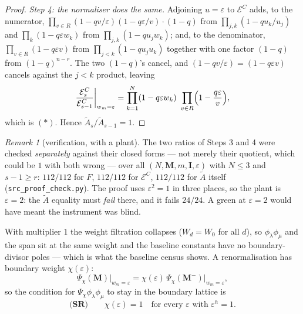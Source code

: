 \documentclass[11pt]{article}
\theoremstyle{plain}
\theoremstyle{definition}
\theoremstyle{remark}
\newtheorem{rem}[thm]{Remark}
\theoremstyle{plain}
\newcommand{\bI}{\mathbf{I}}
\newcommand{\bM}{\mathbf{M}}
\newcommand{\At}{\widetilde{A}}
\begin{document}
\begin{proof}
\emph{Step 4: the normaliser does the same.}  Adjoining $u=\varepsilon$ to
$\mathcal{E}^C$ adds, to the numerator,
$\prod_{v\in R}(1-qv/\varepsilon)(1-q\varepsilon/v)\cdot(1-q)$ from
$\prod_{j,k}(1-qu_k/u_j)$ and $\prod_k(1-q\varepsilon w_k)$ from
$\prod_{j,k}(1-qu_jw_k)$; and, to the denominator,
$\prod_{v\in R}(1-q\varepsilon v)$ from $\prod_{j<k}(1-qu_ju_k)$ together with one
factor $(1-q)$ from $(1-q)^{n-r}$.  The two $(1-q)$'s cancel, and
$(1-qv/\varepsilon)=(1-q\varepsilon v)$ cancels against the $j<k$ product, leaving
\[
  \frac{\mathcal{E}^C_{s}}{\mathcal{E}^C_{s-1}}\bigg|_{w_m=\varepsilon}
  =\prod_{k=1}^{N}(1-q\varepsilon w_k)\ \prod_{v\in R}\Bigl(1-\frac{q\varepsilon}{v}\Bigr),
\]
which is $(\ast)$.  Hence $\At_s/\At_{s-1}=1$.
\end{proof}

\begin{rem}[verification, with a plant]
The two ratios of Steps 3 and 4 were checked \emph{separately} against their
closed forms --- not merely their quotient, which could be $1$ with both wrong ---
over all $(N,\bM,m,\bI,\varepsilon)$ with $N\le3$ and $s-1\ge r$: $112/112$ for
$F$, $112/112$ for $\mathcal{E}^C$, $112/112$ for $\At$ itself
(\texttt{src\_proof\_check.py}).  The proof uses $\varepsilon^2=1$ in three
places, so the plant is $\varepsilon=2$: the $\At$ equality must \emph{fail}
there, and it fails $24/24$.  A green at $\varepsilon=2$ would have meant the
instrument was blind.
\end{rem}

With multiplier $1$ the weight filtration collapses ($W_d=W_0$ for all $d$), so
$\phi_\lambda\phi_\mu$ and the span sit at the same weight and the baseline
constants have no boundary-divisor poles --- which is what the baseline census shows.
A renormalisation has boundary weight $\chi(\varepsilon)$:
\[
  \Psi_\chi(\bM)\big|_{w_m=\varepsilon}
  =\chi(\varepsilon)\,\Psi_\chi(\bM^{-})\big|_{w_m=\varepsilon},
\]
so the condition for $\Psi_\chi\phi_\lambda\phi_\mu$ to stay in the boundary
lattice is
\[
  \textbf{(SR)}\qquad \chi(\varepsilon)=1 \quad\text{for every }\varepsilon
  \text{ with }\varepsilon^{h}=1 .
\]
\end{document}
